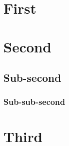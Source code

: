 
\maketitle{}

\vfill{}

\tableofcontents{}

\vfill{}

\pagestyle{fancytext}
\thispagestyle{fancytext}

\newpage{}

\section{First}

\lipsum[1]{}


\section{Second}

\lipsum[2]{}
\autocite{wiki_en}
\autocite{wiki_pl}

\subsection{Sub-second}

\lipsum[3]{}

\subsubsection{Sub-sub-second}

\lipsum[4]{}

\section{Third}

\lipsum[5]{}

\autocite{wiki_en, wiki_pl}

\printbibliography

\begin{comment}
\begingroup
\emergencystretch 0.9em
\printbibliography
\endgroup
\end{comment}

